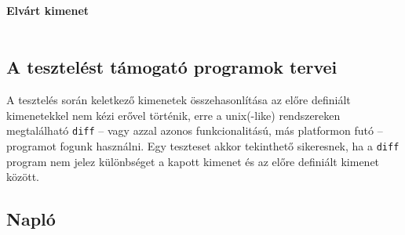 		        \paragraph*{Elvárt kimenet}
\begin{verbatim}

\end{verbatim}
	
	\subsection{A tesztelést támogató programok tervei}
		A tesztelés során keletkező kimenetek összehasonlítása az előre definiált kimenetekkel nem kézi erővel történik, erre a unix(-like) rendszereken megtalálható \texttt{diff} -- vagy azzal azonos funkcionalitású, más platformon futó -- programot fogunk használni. Egy teszteset akkor tekinthető sikeresnek, ha a \texttt{diff} program nem jelez különbséget a kapott kimenet és az előre definiált kimenet között.


	\subsection{Napló}

